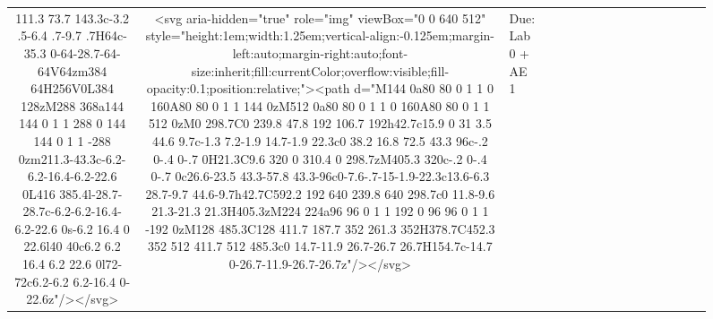 \documentclass[
]{article}
\begin{document}
\begin{figure*}
\begin{longtable*}{cclllccccccccccl}
111.3 73.7 143.3c-3.2 .5-6.4 .7-9.7 .7H64c-35.3 0-64-28.7-64-64V64zm384 64H256V0L384 128zM288 368a144 144 0 1 1 288 0 144 144 0 1 1 -288 0zm211.3-43.3c-6.2-6.2-16.4-6.2-22.6 0L416 385.4l-28.7-28.7c-6.2-6.2-16.4-6.2-22.6 0s-6.2 16.4 0 22.6l40 40c6.2 6.2 16.4 6.2 22.6 0l72-72c6.2-6.2 6.2-16.4 0-22.6z"/></svg> & <svg aria-hidden="true" role="img" viewBox="0 0 640 512" style="height:1em;width:1.25em;vertical-align:-0.125em;margin-left:auto;margin-right:auto;font-size:inherit;fill:currentColor;overflow:visible;fill-opacity:0.1;position:relative;"><path d="M144 0a80 80 0 1 1 0 160A80 80 0 1 1 144 0zM512 0a80 80 0 1 1 0 160A80 80 0 1 1 512 0zM0 298.7C0 239.8 47.8 192 106.7 192h42.7c15.9 0 31 3.5 44.6 9.7c-1.3 7.2-1.9 14.7-1.9 22.3c0 38.2 16.8 72.5 43.3 96c-.2 0-.4 0-.7 0H21.3C9.6 320 0 310.4 0 298.7zM405.3 320c-.2 0-.4 0-.7 0c26.6-23.5 43.3-57.8 43.3-96c0-7.6-.7-15-1.9-22.3c13.6-6.3 28.7-9.7 44.6-9.7h42.7C592.2 192 640 239.8 640 298.7c0 11.8-9.6 21.3-21.3 21.3H405.3zM224 224a96 96 0 1 1 192 0 96 96 0 1 1 -192 0zM128 485.3C128 411.7 187.7 352 261.3 352H378.7C452.3 352 512 411.7 512 485.3c0 14.7-11.9 26.7-26.7 26.7H154.7c-14.7 0-26.7-11.9-26.7-26.7z"/></svg> & Due: Lab 0 + AE 1 \\ 

\end{longtable*}
\end{figure*}
\end{document}
